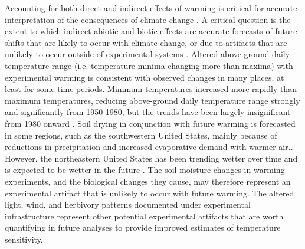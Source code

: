 \documentclass{article}
\begin{document}
\par Accounting for both direct and indirect effects of warming is critical for accurate interpretation of the consequences of climate change \citep{kharouba2015}. %
A critical question is the extent to which indirect abiotic and biotic effects are accurate forecasts of future shifts that are likely to occur with climate change, or due to artifacts that are unlikely to occur outside of experimental systems \citep{moise2010,diamond2013}.%
 Altered above-ground daily temperature range (i.e. temperature minima changing more than maxima) with experimental warming is consistent with observed changes in many places, at least for some time periods. Minimum temperatures increased more rapidly than maximum temperatures, reducing above-ground daily temperature range strongly and significantly from 1950-1980, but the trends have been largely insignificant from 1980 onward \citep{thorne2016,vose2005}. Soil drying in conjunction with future warming is forecasted in some regions, such as the southwestern United States, mainly because of reductions in precipitation and increased evaporative demand with warmer air.\citep{dai2013,seager2013}. However, the northeastern United States has been trending wetter over time and is expected to be wetter in the future \citep{seager2014,shuman2017}. The soil moisture changes in warming experiments, and the biological changes they cause, may therefore represent an experimental artifact that is unlikely to occur with future warming. The altered light, wind, and herbivory patterns documented under experimental infrastructure \citep{kennedy1995,moise2010,wolkovich2012,hoeppner2012, clark2014b} represent other potential experimental artifacts that are worth quantifying in future analyses to provide improved estimates of temperature sensitivity.
\end{document}
